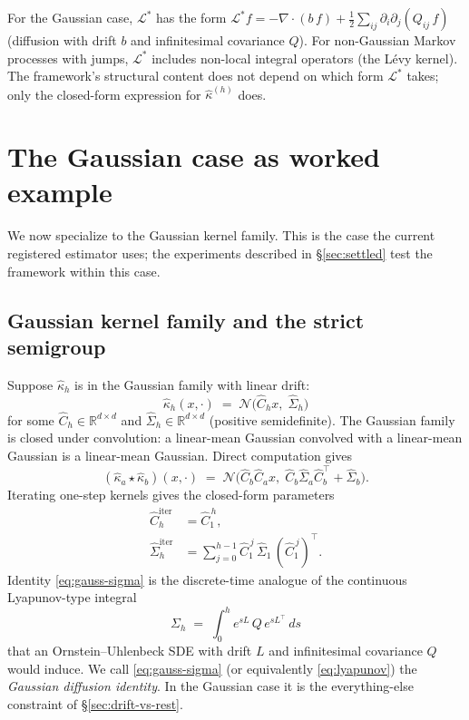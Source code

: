 \documentclass[11pt]{article}
\newcommand{\Rb}{\mathbb{R}}
\newcommand{\Nrm}{\mathcal{N}}
\newcommand{\Lcal}{\mathcal{L}}
\newcommand{\compose}{\star}
\theoremstyle{definition}
\theoremstyle{plain}
\begin{document}
For the Gaussian case, $\Lcal^{*}$ has the form
$\Lcal^{*} f = -\nabla \cdot (b\, f) + \tfrac{1}{2}
\sum_{ij} \partial_i \partial_j(Q_{ij}\, f)$
(diffusion with drift $b$ and infinitesimal covariance $Q$).
For non-Gaussian Markov processes with jumps, $\Lcal^{*}$ includes
non-local integral operators (the L\'evy kernel). The framework's
structural content does not depend on which form $\Lcal^{*}$ takes;
only the closed-form expression for $\hat\kappa^{(h)}$ does.

\section{The Gaussian case as worked example}
\label{sec:gaussian}

We now specialize to the Gaussian kernel family. This is the case
the current registered estimator uses; the experiments described
in \S\ref{sec:settled} test the framework within this case.

\subsection{Gaussian kernel family and the strict semigroup}
\label{sec:gauss-strict}

Suppose $\hat\kappa_h$ is in the Gaussian family with linear drift:
\begin{equation}
  \label{eq:gauss-kernel}
  \hat\kappa_h(x, \cdot) \;=\; \Nrm\!\bigl(\hat C_h x,\; \hat\Sigma_h\bigr)
\end{equation}
for some $\hat C_h \in \Rb^{d \times d}$ and
$\hat\Sigma_h \in \Rb^{d \times d}$ (positive semidefinite). The
Gaussian family is closed under convolution: a linear-mean Gaussian
convolved with a linear-mean Gaussian is a linear-mean Gaussian.
Direct computation gives
\begin{equation}
  \label{eq:gauss-compose}
  (\hat\kappa_a \compose \hat\kappa_b)(x, \cdot) \;=\;
  \Nrm\!\bigl(\hat C_b \hat C_a x,\; \hat C_b \hat\Sigma_a \hat C_b^{\top} + \hat\Sigma_b\bigr).
\end{equation}
Iterating one-step kernels gives the closed-form parameters
\begin{align}
  \label{eq:gauss-Ch}
  \hat C_h^{\mathrm{iter}} &= \hat C_1^{\,h}, \\
  \label{eq:gauss-sigma}
  \hat\Sigma_h^{\mathrm{iter}} &= \sum_{j=0}^{h-1}
    \hat C_1^{\,j}\, \hat\Sigma_1\, (\hat C_1^{\,j})^{\top}.
\end{align}
Identity \eqref{eq:gauss-sigma} is the discrete-time analogue of
the continuous Lyapunov-type integral
\begin{equation}
  \label{eq:lyapunov}
  \Sigma_h \;=\; \int_0^h e^{sL}\, Q\, e^{sL^{\top}}\, ds
\end{equation}
that an Ornstein--Uhlenbeck SDE with drift $L$ and infinitesimal
covariance $Q$ would induce. We call \eqref{eq:gauss-sigma} (or
equivalently \eqref{eq:lyapunov}) the \emph{Gaussian diffusion
identity}. In the Gaussian case it is the everything-else
constraint of \S\ref{sec:drift-vs-rest}.
\end{document}
